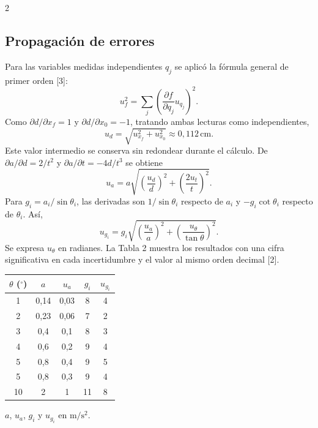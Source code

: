 \documentclass[10pt,letterpaper]{article}
\begin{document}
\begin{multicols}{2}
\subsection{Propagación de errores}
Para las variables medidas independientes $q_j$ se aplicó la fórmula general de primer orden [3]:
\begin{equation}
u_f^2=\sum_j\left(\frac{\partial f}{\partial q_j}u_{q_j}\right)^2.
\end{equation}
Como $\partial d/\partial x_f=1$ y $\partial d/\partial x_0=-1$, tratando ambas lecturas como independientes,
\begin{equation}
u_d=\sqrt{u_{x_f}^2+u_{x_0}^2}\approx0{,}112\,\mathrm{cm}.
\end{equation}
Este valor intermedio se conserva sin redondear durante el cálculo. De $\partial a/\partial d=2/t^2$ y $\partial a/\partial t=-4d/t^3$ se obtiene
\begin{equation}
u_a=a\sqrt{\left(\frac{u_d}{d}\right)^2+
\left(\frac{2u_t}{t}\right)^2}.
\end{equation}
Para $g_i=a_i/\sin\theta_i$, las derivadas son $1/\sin\theta_i$ respecto de $a_i$ y $-g_i\cot\theta_i$ respecto de $\theta_i$. Así,
\begin{equation}
u_{g_i}=g_i\sqrt{\left(\frac{u_a}{a}\right)^2+
\left(\frac{u_\theta}{\tan\theta}\right)^2}.
\end{equation}
Se expresa $u_\theta$ en radianes. La Tabla 2 muestra los resultados con una cifra significativa en cada incertidumbre y el valor al mismo orden decimal [2].

\begin{center}\begin{minipage}{\linewidth}\centering
{}
\small
\begin{tabular}{ccccc}\toprule
$\theta$ ($^\circ$) & $a$ & $u_a$ & $g_i$ & $u_{g_i}$ \\ \midrule
1 & 0,14 & 0,03 & 8 & 4 \\
2 & 0,23 & 0,06 & 7 & 2 \\
3 & 0,4 & 0,1 & 8 & 3 \\
4 & 0,6 & 0,2 & 9 & 4 \\
5 & 0,8 & 0,4 & 9 & 5 \\
5 & 0,8 & 0,3 & 9 & 4 \\
10 & 2 & 1 & 11 & 8 \\
\bottomrule\end{tabular}
\par\vspace{2pt}\footnotesize $a$, $u_a$, $g_i$ y $u_{g_i}$ en $\mathrm{m/s^2}$.
\end{minipage}\end{center}


\end{multicols}
\end{document}
